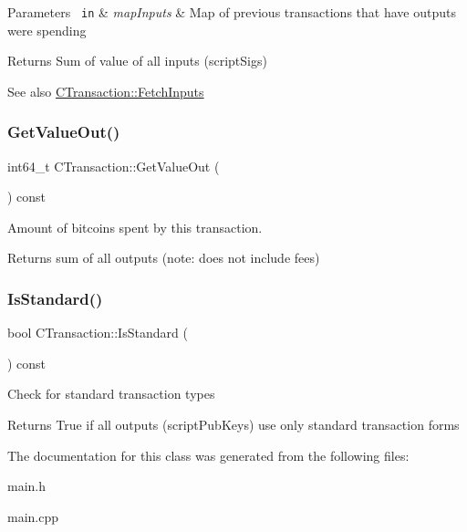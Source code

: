\begin{DoxyParams}[1]{Parameters}
\mbox{\texttt{ in}}  & {\em map\+Inputs} & Map of previous transactions that have outputs we\textquotesingle{}re spending \\
\hline
\end{DoxyParams}
\begin{DoxyReturn}{Returns}
Sum of value of all inputs (script\+Sigs) 
\end{DoxyReturn}
\begin{DoxySeeAlso}{See also}
\mbox{\hyperlink{class_c_transaction_a5a4967303d3b588a120687f3ed1f4b0a}{C\+Transaction\+::\+Fetch\+Inputs}} 
\end{DoxySeeAlso}
\mbox{\label{class_c_transaction_a9ce7d94c68adb37627d82669b83a7c59}} 
\subsubsection{\texorpdfstring{GetValueOut()}{GetValueOut()}}
{\footnotesize\ttfamily int64\+\_\+t C\+Transaction\+::\+Get\+Value\+Out (\begin{DoxyParamCaption}{ }\end{DoxyParamCaption}) const\hspace{0.3cm}{\ttfamily [inline]}}

Amount of bitcoins spent by this transaction. \begin{DoxyReturn}{Returns}
sum of all outputs (note\+: does not include fees) 
\end{DoxyReturn}
\mbox{\label{class_c_transaction_a270e669ab6d491a44d50383ad8ce622b}} 
\subsubsection{\texorpdfstring{IsStandard()}{IsStandard()}}
{\footnotesize\ttfamily bool C\+Transaction\+::\+Is\+Standard (\begin{DoxyParamCaption}{ }\end{DoxyParamCaption}) const}

Check for standard transaction types \begin{DoxyReturn}{Returns}
True if all outputs (script\+Pub\+Keys) use only standard transaction forms 
\end{DoxyReturn}


The documentation for this class was generated from the following files\+:\begin{DoxyCompactItemize}
\item 
main.\+h\item 
main.\+cpp\end{DoxyCompactItemize}
